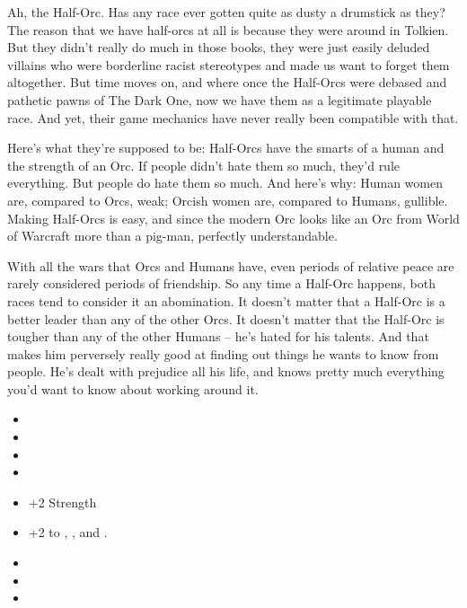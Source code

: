 \vspace*{-8pt}

Ah, the Half-Orc. Has any race ever gotten quite as dusty a drumstick as they? The reason that we have half-orcs at all is because they were around in Tolkien. But they didn't really do much in those books, they were just easily deluded villains who were borderline racist stereotypes and made us want to forget them altogether. But time moves on, and where once the Half-Orcs were debased and pathetic pawns of The Dark One, now we have them as a legitimate playable race. And yet, their game mechanics have never really been compatible with that.

Here's what they're supposed to be: Half-Orcs have the smarts of a human and the strength of an Orc. If people didn't hate them so much, they'd rule everything. But people do hate them so much. And here's why: Human women are, compared to Orcs, weak; Orcish women are, compared to Humans, gullible. Making Half-Orcs is easy, and since the modern Orc looks like an Orc from World of Warcraft more than a pig-man, perfectly understandable.

With all the wars that Orcs and Humans have, even periods of relative peace are rarely considered periods of friendship. So any time a Half-Orc happens, both races tend to consider it an abomination. It doesn't matter that a Half-Orc is a better leader than any of the other Orcs. It doesn't matter that the Half-Orc is tougher than any of the other Humans -- he's hated for his talents. And that makes him perversely really good at finding out things he wants to know from people. He's dealt with prejudice all his life, and knows pretty much everything you'd want to know about working around it.

\begin{itemize}
\item {}
\item {}
\item {}
\item {}
\item +2 Strength
\item +2 to , , and .
\item {}
\item {}
\item {}
\end{itemize}
